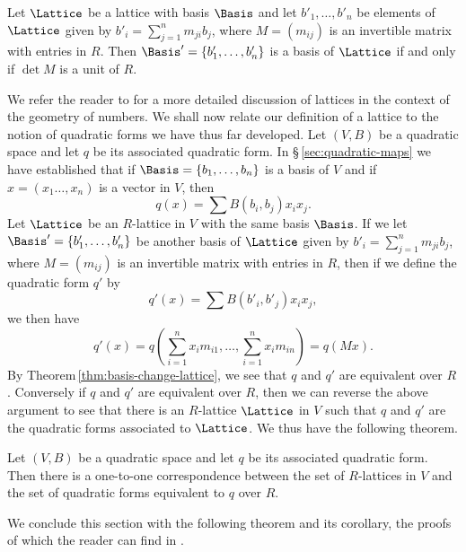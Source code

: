 \begin{theoremx}
    \label{thm:basis-change-lattice}
    Let \(\Lattice\) be a lattice with basis \(\Basis\) and let \(b'_1, \dots,
    b'_n\) be elements of \(\Lattice\) given by \(b'_i = \sum_{j=1}^n m_{ji}
    b_j\), where \(M = (m_{ij})\) is an invertible matrix with entries in \(R\).
    Then \(\Basis' = \{b'_1, \dots, b'_n\}\) is a basis of \(\Lattice\) if and
    only if \(\det M\) is a unit of \(R\).
\end{theoremx}

We refer the reader to \cite[pp.\,4--20]{cassels1961geometry} for a more
detailed discussion of lattices in the context of the geometry of numbers. We
shall now relate our definition of a lattice to the notion of quadratic forms we
have thus far developed. Let \((V,B)\) be a quadratic space and let \(q\) be its
associated quadratic form. In \S\,\ref{sec:quadratic-maps} we have established
that if \(\Basis = \{b_1, \dots, b_n \}\) is a basis of \(V\) and if \(x = (x_1
\dots, x_n)\) is a vector in \(V\), then
\[
    q(x) = \sum B(b_i, b_j) x_i x_j.
\]
Let \(\Lattice\) be an \(R\)-lattice in \(V\) with the same basis \(\Basis\). If
we let \(\Basis' = \{b'_1, \dots, b'_n\}\) be another basis of \(\Lattice\)
given by \(b'_i = \sum_{j=1}^n m_{ji} b_j\), where \(M = (m_{ij})\) is an
invertible matrix with entries in \(R\), then if we define the quadratic form
\(q'\) by
\[
    q'(x) = \sum B(b'_i, b'_j) x_i x_j,
\]
we then have
\[
    q'(x) = q\left(\sum_{i=1}^n x_i m_{i1}, \dots, \sum_{i=1}^n x_i m_{in}\right) = q(Mx).
\]
By Theorem\,\ref{thm:basis-change-lattice}, we see that \(q\) and \(q'\) are
equivalent over \(R\). Conversely if \(q\) and \(q'\) are equivalent over \(R\),
then we can reverse the above argument to see that there is an \(R\)-lattice
\(\Lattice\) in \(V\) such that \(q\) and \(q'\) are the quadratic forms
associated to \(\Lattice\). We thus have the following theorem.

\begin{theoremx}
    \label{thm:quadratic-form-lattice}
    Let \((V,B)\) be a quadratic space and let \(q\) be its associated quadratic
    form. Then there is a one-to-one correspondence between the set of
    \(R\)-lattices in \(V\) and the set of quadratic forms equivalent to \(q\)
    over \(R\).
\end{theoremx}

We conclude this section with the following theorem and its corollary, the
proofs of which the reader can find in \cite[p.\,106--108]{cassels2008rational}.

